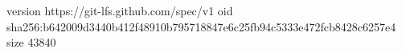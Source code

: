 version https://git-lfs.github.com/spec/v1
oid sha256:b642009d3440b412f48910b795718847e6c25fb94c5333e472fcb8428c6257e4
size 43840
